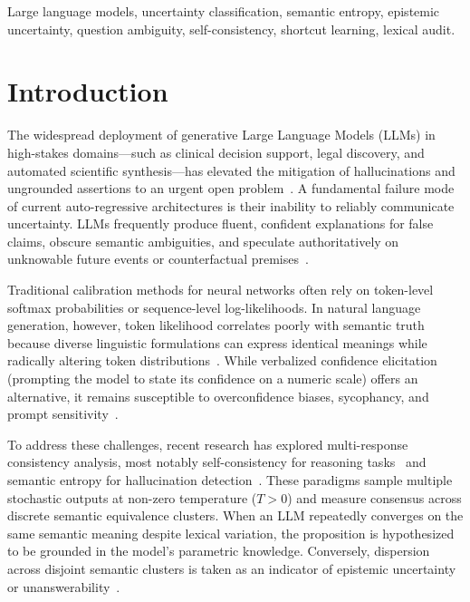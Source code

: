 \documentclass[conference]{IEEEtran}
\begin{document}
\begin{IEEEkeywords}
Large language models, uncertainty classification, semantic entropy, epistemic uncertainty, question ambiguity, self-consistency, shortcut learning, lexical audit.
\end{IEEEkeywords}

\section{Introduction}

The widespread deployment of generative Large Language Models (LLMs) in high-stakes domains—such as clinical decision support, legal discovery, and automated scientific synthesis—has elevated the mitigation of hallucinations and ungrounded assertions to an urgent open problem~\cite{farquhar2024detecting}. A fundamental failure mode of current auto-regressive architectures is their inability to reliably communicate uncertainty. LLMs frequently produce fluent, confident explanations for false claims, obscure semantic ambiguities, and speculate authoritatively on unknowable future events or counterfactual premises~\cite{kadavath2022language,xiong2024can}.

Traditional calibration methods for neural networks often rely on token-level softmax probabilities or sequence-level log-likelihoods. In natural language generation, however, token likelihood correlates poorly with semantic truth because diverse linguistic formulations can express identical meanings while radically altering token distributions~\cite{kuhn2023semantic}. While verbalized confidence elicitation (prompting the model to state its confidence on a numeric scale) offers an alternative, it remains susceptible to overconfidence biases, sycophancy, and prompt sensitivity~\cite{mielke2022reducing,xiong2024can}.

To address these challenges, recent research has explored multi-response consistency analysis, most notably self-consistency for reasoning tasks~\cite{wang2023self} and semantic entropy for hallucination detection~\cite{kuhn2023semantic,farquhar2024detecting}. These paradigms sample multiple stochastic outputs at non-zero temperature ($T > 0$) and measure consensus across discrete semantic equivalence clusters. When an LLM repeatedly converges on the same semantic meaning despite lexical variation, the proposition is hypothesized to be grounded in the model's parametric knowledge. Conversely, dispersion across disjoint semantic clusters is taken as an indicator of epistemic uncertainty or unanswerability~\cite{chen2023quantifying}.
\end{document}
